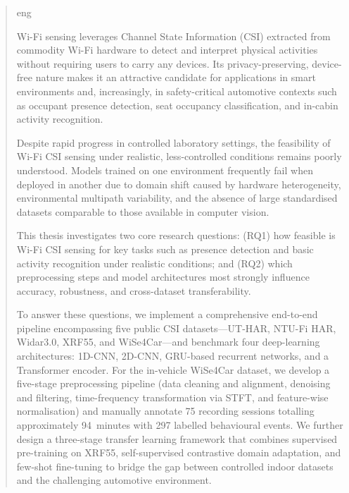 \documentclass[english,bibtex]{kththesis}
\begin{document}

\kthcover
\clearpage\thispagestyle{empty}\mbox{}
\titlepage
\bookinfopage

\frontmatter
\setcounter{page}{1}

\begin{abstract}
  \markboth{\abstractname}{}
\begin{scontents}[store-env=lang]
eng
\end{scontents}
\begin{scontents}[store-env=abstracts,print-env=true]
Wi-Fi sensing leverages Channel State Information (CSI) extracted from commodity Wi-Fi hardware to detect and interpret physical activities without requiring users to carry any devices. Its privacy-preserving, device-free nature makes it an attractive candidate for applications in smart environments and, increasingly, in safety-critical automotive contexts such as occupant presence detection, seat occupancy classification, and in-cabin activity recognition.

Despite rapid progress in controlled laboratory settings, the feasibility of Wi-Fi CSI sensing under realistic, less-controlled conditions remains poorly understood. Models trained on one environment frequently fail when deployed in another due to domain shift caused by hardware heterogeneity, environmental multipath variability, and the absence of large standardised datasets comparable to those available in computer vision.

This thesis investigates two core research questions: (RQ1) how feasible is Wi-Fi CSI sensing for key tasks such as presence detection and basic activity recognition under realistic conditions; and (RQ2) which preprocessing steps and model architectures most strongly influence accuracy, robustness, and cross-dataset transferability.

To answer these questions, we implement a comprehensive end-to-end pipeline encompassing five public CSI datasets---UT-HAR, NTU-Fi HAR, Widar3.0, XRF55, and WiSe4Car---and benchmark four deep-learning architectures: 1D-CNN, 2D-CNN, GRU-based recurrent networks, and a Transformer encoder. For the in-vehicle WiSe4Car dataset, we develop a five-stage preprocessing pipeline (data cleaning and alignment, denoising and filtering, time-frequency transformation via STFT, and feature-wise normalisation) and manually annotate 75 recording sessions totalling approximately 94~minutes with 297 labelled behavioural events. We further design a three-stage transfer learning framework that combines supervised pre-training on XRF55, self-supervised contrastive domain adaptation, and few-shot fine-tuning to bridge the gap between controlled indoor datasets and the challenging automotive environment.


\end{scontents}
\end{abstract}
\end{document}
